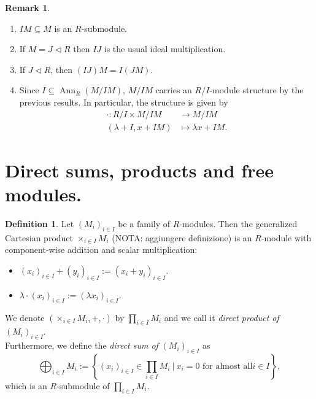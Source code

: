 \documentclass[12pt,a4paper]{report}
\theoremstyle{definition}
\newtheorem{defn}[theorem]{Definition}
\newtheorem*{remark}{Remark}
\theoremstyle{num.custom-title}
\DeclareMathOperator{\Ann}{Ann}
\DeclareMathOperator{\sse}{\subseteq}
\begin{document}
\begin{remark}\label{fac-mod_fac-ring} \ 
\begin{enumerate}
\item $IM \sse M$ is an $R$-submodule.
\item If $M=J \lhd R$ then $IJ$ is the usual ideal multiplication.
\item If $J \lhd R$, then $(IJ)M=I(JM)$.
\item Since $I \sse \Ann_R(M/IM)$, $M/IM$ carries an $R/I$-module structure by the previous results. In particular, the structure is given by
\begin{align*}
\cdot \colon R/I \times M/IM &\to M/IM \\
(\lambda + I, x + IM) &\mapsto \lambda x + IM.
\end{align*}
\end{enumerate}
\end{remark}

\section{Direct sums, products and free modules.}

\begin{defn}
Let $(M_i)_{i \in I}$ be a family of $R$-modules. Then the generalized Cartesian product $\times_{i \in I} M_i$ (NOTA: aggiungere definizione) is an $R$-module with component-wise addition and scalar multiplication:
\begin{itemize}
\item $(x_i)_{i \in I} + (y_i)_{i \in I} := (x_i+y_i)_{i \in I}$.
\item $\lambda \cdot (x_i)_{i \in I} := (\lambda x_i)_{i \in I}$.
\end{itemize}
We denote $(\times_{i \in I} M_i, +, \cdot)$ by $\prod_{i \in I} M_i$ and we call it \emph{direct product of} $(M_i)_{i \in I}$.\\
Furthermore, we define the \emph{direct sum of} $(M_i)_{i \in I}$ as
\[
\bigoplus_{i \in I} M_i := \left\{ (x_i)_{i \in I} \in \prod_{i \in I} M_i \ \Bigg| \ x_i = 0 \text{ for almost all} i \in I \right\},
\]
which is an $R$-submodule of $\prod_{i \in I} M_i$.
\end{defn}
\end{document}
